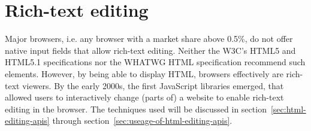 \section{Rich-text editing}

Major browsers, i.e. any browser with a market share above 0.5\%\cite{ag}, do not offer native input fields that allow rich-text editing. Neither the W3C's HTML5 and HTML5.1 specifications nor the WHATWG HTML specification recommend such elements. However, by being able to display HTML, browsers effectively are rich-text viewers. By the early 2000s, the first JavaScript libraries emerged, that allowed users to interactively change (parts of) a website to enable rich-text editing in the browser. The techniques used will be discussed in section~\ref{sec:html-editing-apis} through section~\ref{sec:useage-of-html-editing-apis}.


